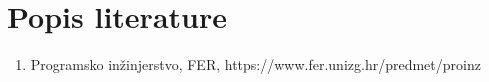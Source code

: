 \chapter*{Popis literature}

    \begin{enumerate}
        \item Programsko inžinjerstvo, FER, https://www.fer.unizg.hr/predmet/proinz
        
    \end{enumerate}